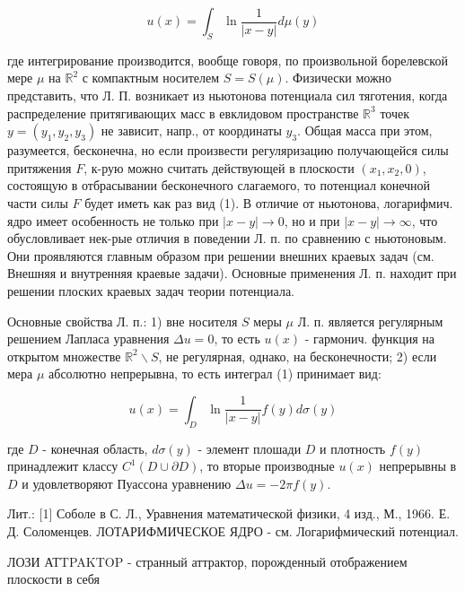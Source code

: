 \documentclass[10pt]{article}
\begin{document}
\[

u(x)=\int_{S} \ln \frac{1}{|x-y|} d \mu(y)

\]



где интегрирование производится, вообще говоря, по произвольной борелевской мере $\mu$ на $\mathbb{R}^{2}$ с компактным носителем $S=S(\mu)$. Физически можно представить, что Л. П. возникает из ньютонова потенциала сил тяготения, когда распределение притягивающих масс в евклидовом пространстве $\mathbb{R}^{3}$ точек $y=\left(y_{1}, y_{2}, y_{3}\right)$ не зависит, напр., от координаты $y_{3}$. Общая масса при этом, разумеется, бесконечна, но если произвести регуляризацию получающейся силы притяжения $F$, к-рую можно считать действующей в плоскости $\left(x_{1}, x_{2}, 0\right)$, состоящую в отбрасывании бесконечного слагаемого, то потенциал конечной части силы $F$ будет иметь как раз вид (1). В отличие от ньютонова, логарифмич. ядро имеет особенность не только при $|x-y| \rightarrow 0$, но и при $|x-y| \rightarrow \infty$, что обусловливает нек-рые отличия в поведении Л. п. по сравнению с ньютоновым. Они проявляются главным образом при решении внешних краевых задач (см. Внешняя и внутренняя краевые задачи). Основные применения Л. п. находит при решении плоских краевых задач теории потенциала.



Основные свойства Л. п.: 1) вне носителя $S$ меры $\mu$ Л. п. является регулярным решением Лапласа уравнения $\Delta u=0$, то есть $u(x)$ - гармонич. функция на открытом множестве $\mathbb{R}^{2} \backslash S$, не регулярная, однако, на бесконечности; 2) если мера $\mu$ абсолютно непрерывна, то есть интеграл (1) принимает вид:



\[

u(x)=\int_{D} \ln \frac{1}{|x-y|} f(y) d \sigma(y)

\]



где $D$ - конечная область, $d \sigma(y)$ - элемент плошади $D$ и плотность $f(y)$ принадлежит классу $C^{1}(D \cup \partial D)$, то вторые производные $u(x)$ непрерывны в $D$ и удовлетворяют Пуассона уравнению $\Delta u=-2 \pi f(y)$.



Лит.: [1] Соболе в С. Л., Уравнения математической физики, 4 изд., М., 1966. Е. Д. Соломенцев. ЛОТАРИФМИЧЕСКОЕ ЯДРО - см. Логарифмический потенциал.



ЛОЗИ АТTPAKTOP - странный аттрактор, порожденный отображением плоскости в себя
\end{document}
